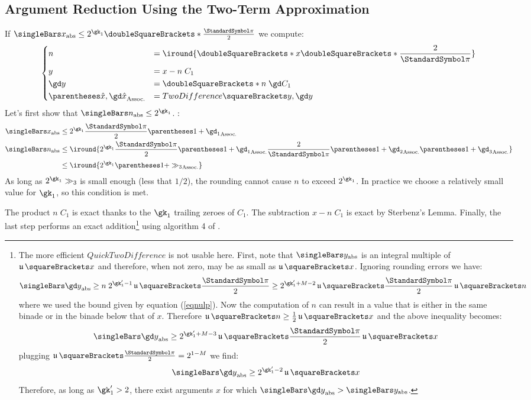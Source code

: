 \documentclass[10pt, a4paper, twoside]{basestyle}
\DeclareMathOperator{\ULP}{\mathfrak u}
\newcommand{\round}[1]{\doubleSquareBrackets*{#1}}
\begin{document}
\subsection*{Argument Reduction Using the Two-Term Approximation}
If $\abs x \leq 2^{\gk_1} \round{\frac{\Pi}{2}}$ we compute:
\[
\begin{dcases}
n &= \iround{\round{x \round{\frac{2}{\Pi}}}} \\
y &= x - n \; C_1 \\
\gd y &= \round{n \; \gd C_1} \\
\pa{\hat x, \gd \hat x} &= TwoDifference\of{y, \gd y}
\end{dcases}
\]
Let's first show that $\abs n \leq 2^{\gk_1}$. :
\begin{align*}
\abs x &\leq 2^{\gk_1} \frac{\Pi}{2} \pa{1 + \gd_1} \\
\abs n &\leq \iround{2^{\gk_1} \frac{\Pi}{2} \pa{1 + \gd_1} \frac{2}{\Pi} \pa{1 + \gd_2} \pa{1 + \gd_3}} \\
&\leq \iround{2^{\gk_1} \pa{1 + \gg_3}}
\end{align*}
As long as $2^{\gk_1} \gg_3$ is small enough (less that $1/2$), the rounding cannot cause $n$ to exceed $2^{\gk_1}$.  In practice we choose a relatively small value for $\gk_1$, so this condition is met.

The product $n \; C_1$ is exact thanks to the $\gk_1$ trailing zeroes of $C_1$.  The subtraction $x - n \; C_1$ is exact by Sterbenz's Lemma.  Finally, the last step performs an exact addition\footnote{The more efficient $QuickTwoDifference$ is not usable here.  First, note that $\abs y$ is an integral multiple of $\ULP\of{x}$ and therefore, when not zero, may be as small as $\ULP\of{x}$. Ignoring rounding errors we have:
\[ 
\abs{\gd y} \geq n \; 2^{\gk'_1 - 1} \ULP\of{\frac{\Pi}{2}} \geq 2^{\gk'_1 + M - 2} \ULP\of{\frac{\Pi}{2}} \ULP\of{n}
\]
where we used the bound given by equation (\ref{eqnulp}).  Now the computation of $n$ can result in a value that is either in the same binade or in the binade below that of $x$.  Therefore $\ULP\of{n} \geq \frac{1}{2} \ULP\of{x}$ and the above inequality becomes:
\[
\abs{\gd y} \geq 2^{\gk'_1 + M - 3} \ULP\of{\frac{\Pi}{2}} \ULP\of{x}
\]
plugging $\ULP\of{\frac{\Pi}{2}} = 2^{1 - M}$ we find:
\[
\abs{\gd y} \geq 2^{\gk'_1 - 2} \ULP\of{x}
\]
Therefore, as long as $\gk'_1 > 2$, there exist arguments $x$ for which $\abs{\gd y} > \abs y$.
} using algorithm 4 of \cite{HidaLiBailey2007}.
\end{document}
